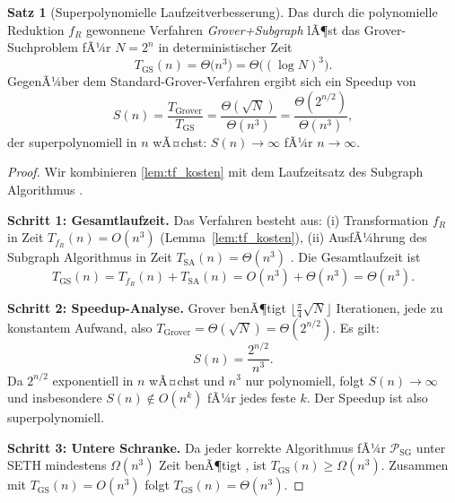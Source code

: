 ﻿\documentclass[11pt,a4paper]{article}
\theoremstyle{definition}
\newtheorem{theorem}{Satz}[section]
\begin{document}
\begin{theorem}[Superpolynomielle Laufzeitverbesserung]
\label{thm:hauptsatz}
  Das durch die polynomielle Reduktion $f_R$ gewonnene Verfahren
  \emph{Grover+Subgraph} lÃ¶st das Grover-Suchproblem fÃ¼r $N = 2^n$ in
  deterministischer Zeit
  \begin{equation}
    T_{\mathrm{GS}}(n) = \Theta\!\bigl(n^3\bigr) = \Theta\!\bigl((\log N)^3\bigr).
    \label{eq:T_GS}
  \end{equation}
  GegenÃ¼ber dem Standard-Grover-Verfahren ergibt sich ein Speedup von
  \begin{equation}
    S(n) = \frac{T_{\mathrm{Grover}}}{T_{\mathrm{GS}}}
          = \frac{\Theta(\sqrt{N})}{\Theta(n^3)}
          = \frac{\Theta(2^{n/2})}{\Theta(n^3)},
    \label{eq:speedup}
  \end{equation}
  der superpolynomiell in $n$ wÃ¤chst: $S(n) \to \infty$ fÃ¼r $n \to \infty$.
\end{theorem}

\begin{proof}
  Wir kombinieren \cref{lem:tf_kosten} mit dem Laufzeitsatz des Subgraph
  Algorithmus \cite{Epp2026}.

  \textbf{Schritt 1: Gesamtlaufzeit.}
  Das Verfahren besteht aus:
  (i) Transformation $f_R$ in Zeit $T_{f_R}(n) = O(n^3)$ (Lemma~\ref{lem:tf_kosten}),
  (ii) AusfÃ¼hrung des Subgraph Algorithmus in Zeit $T_{\mathrm{SA}}(n) = \Theta(n^3)$
  \cite{Epp2026}.  Die Gesamtlaufzeit ist
  \begin{equation}
    T_{\mathrm{GS}}(n) = T_{f_R}(n) + T_{\mathrm{SA}}(n) = O(n^3) + \Theta(n^3)
    = \Theta(n^3).
  \end{equation}

  \textbf{Schritt 2: Speedup-Analyse.}
  Grover benÃ¶tigt $\lfloor \tfrac{\pi}{4}\sqrt{N} \rfloor$ Iterationen,
  jede zu konstantem Aufwand, also $T_{\mathrm{Grover}} = \Theta(\sqrt{N}) = \Theta(2^{n/2})$.
  Es gilt:
  \begin{equation}
    S(n) = \frac{2^{n/2}}{n^3}.
  \end{equation}
  Da $2^{n/2}$ exponentiell in $n$ wÃ¤chst und $n^3$ nur polynomiell,
  folgt $S(n) \to \infty$ und insbesondere $S(n) \notin O(n^k)$ fÃ¼r jedes
  feste $k$.  Der Speedup ist also superpolynomiell.

  \textbf{Schritt 3: Untere Schranke.}
  Da jeder korrekte Algorithmus fÃ¼r $\mathcal{P}_{\mathrm{SG}}$ unter SETH
  mindestens $\Omega(n^3)$ Zeit benÃ¶tigt \cite{Epp2026}, ist
  $T_{\mathrm{GS}}(n) \geq \Omega(n^3)$.  Zusammen mit $T_{\mathrm{GS}}(n) = O(n^3)$
  folgt $T_{\mathrm{GS}}(n) = \Theta(n^3)$.
\end{proof}
\end{document}
